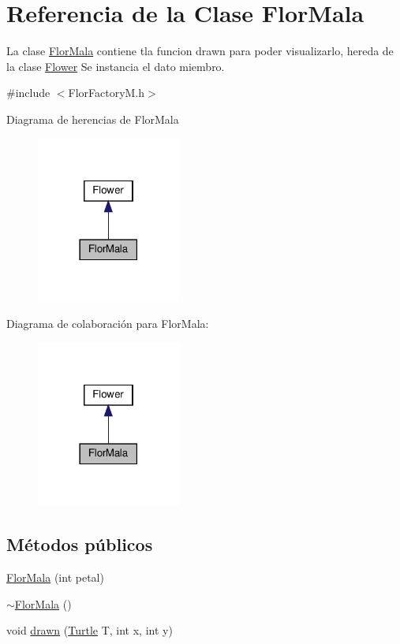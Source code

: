 \hypertarget{classFlorMala}{}\section{Referencia de la Clase Flor\+Mala}
\label{classFlorMala}


La clase \hyperlink{classFlorMala}{Flor\+Mala} contiene tla funcion drawn para poder visualizarlo, hereda de la clase \hyperlink{classFlower}{Flower}  Se instancia el dato miembro.  




{\ttfamily \#include $<$Flor\+Factory\+M.\+h$>$}



Diagrama de herencias de Flor\+Mala\nopagebreak
\begin{figure}[H]
\begin{center}
\leavevmode
\includegraphics[width=134pt]{classFlorMala__inherit__graph}
\end{center}
\end{figure}


Diagrama de colaboración para Flor\+Mala\+:\nopagebreak
\begin{figure}[H]
\begin{center}
\leavevmode
\includegraphics[width=134pt]{classFlorMala__coll__graph}
\end{center}
\end{figure}
\subsection*{Métodos públicos}
\begin{DoxyCompactItemize}
\item 
\hyperlink{classFlorMala_ae429d216656c3c4ea50e71ee0740079f}{Flor\+Mala} (int petal)
\item 
\hyperlink{classFlorMala_ae85e1a4162127aad42b44d6609e5ce3f}{$\sim$\+Flor\+Mala} ()
\item 
void \hyperlink{classFlorMala_aee0f20f3aa80d9ce3cb9c6fdbf036a7c}{drawn} (\hyperlink{classTurtle}{Turtle} T, int x, int y)
\end{DoxyCompactItemize}
